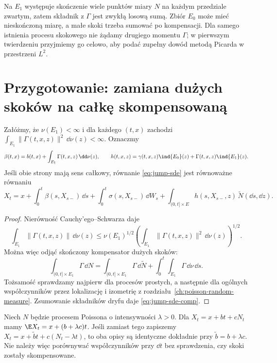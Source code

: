 \begin{uwaga}
Na $E_1$ występuje skończenie wiele punktów miary $N$ na każdym
przedziale zwartym, zatem składnik z $\Gamma$ jest zwykłą losową
sumą. Zbiór $E_0$ może mieć nieskończoną miarę, a małe skoki
trzeba sumować po kompensacji. Dla samego istnienia procesu
skokowego nie żądamy drugiego momentu $\Gamma$; w pierwszym
twierdzeniu przyjmiemy go celowo, aby podać zupełny dowód
metodą Picarda w przestrzeni $L^2$.
\end{uwaga}

\section{Przygotowanie: zamiana dużych skoków na całkę skompensowaną}

\begin{lemat}
\label{lem:rewrite-jump-sde}
Załóżmy, że $\nu(E_1)<\infty$ i dla każdego $(t,x)$ zachodzi
$\int_{E_1}\|\Gamma(t,x,z)\|^2\,\dd\nu(z)<\infty$.
Oznaczmy
\[
 \beta(t,x)=b(t,x)+\int_{E_1}\Gamma(t,x,z)\,\dd\nu(z),\qquad
 h(t,x,z)=\gamma(t,x,z)\ind{E_0}(z)+\Gamma(t,x,z)\ind{E_1}(z).
\]
Jeśli obie strony mają sens całkowy, równanie
\eqref{eq:jump-sde} jest równoważne równaniu
\[
 X_t=x+\int_0^t\beta(s,X_{s-})\,\dd s
 +\int_0^t\sigma(s,X_{s-})\,\dd W_s
 +\int_{(0,t]\times E}h(s,X_{s-},z)\,\widetilde N(\dd s,\dd z).
 \tag{13.2}\label{eq:jump-sde-comp}
\]
\end{lemat}
\begin{proof}
Nierówność Cauchy'ego--Schwarza daje
\[
\int_{E_1}\|\Gamma(t,x,z)\|\,\dd\nu(z)
\le \nu(E_1)^{1/2}
\left(\int_{E_1}\|\Gamma(t,x,z)\|^2\,\dd\nu(z)\right)^{1/2}.
\]
Można więc odjąć skończony kompensator dużych skoków:
\[
\int_{(0,t]\times E_1}\Gamma\,\dd N
=\int_{(0,t]\times E_1}\Gamma\,\dd\widetilde N
 +\int_0^t\int_{E_1}\Gamma\,\dd\nu\,\dd s.
\]
Tożsamość sprawdzamy najpierw dla procesów prostych,
a następnie dla ogólnych współczynników przez lokalizację
i izometrię z rozdziału~\ref{ch:poisson-random-measure}.
Zsumowanie składników dryfu daje \eqref{eq:jump-sde-comp}.
\end{proof}

\begin{przyklad}
Niech $N$ będzie procesem Poissona o intensywności
$\lambda>0$. Dla $X_t=x+bt+cN_t$ mamy
$\E X_t=x+(b+\lambda c)t$. Jeśli zamiast tego zapiszemy
$X_t=x+\widetilde b t+c(N_t-\lambda t)$, to oba opisy
są identyczne dokładnie przy $\widetilde b=b+\lambda c$.
Nie należy więc porównywać współczynników przy $\dd t$ bez
sprawdzenia, czy skoki zostały skompensowane.
\end{przyklad}

